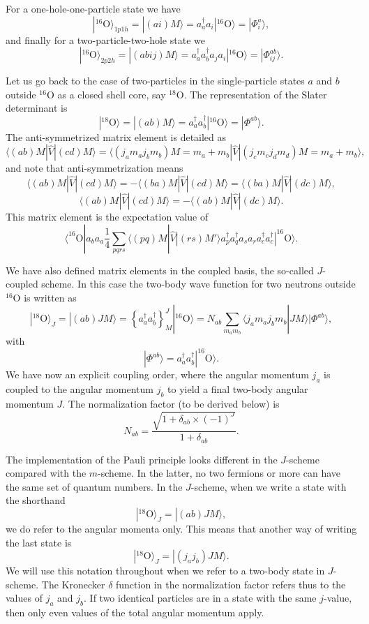 \documentclass[graybox,sectrefs,envcountresetchap,open=right]{svmonodo}
\begin{document}
For a one-hole-one-particle state we have
\[
|^{16}\mathrm{O}\rangle_{1p1h} =|(ai)M\rangle  = a_a^{\dagger}a_i|^{16}\mathrm{O}\rangle=|\Phi_{i}^a\rangle,
\]
and finally for a two-particle-two-hole state we 
\[
|^{16}\mathrm{O}\rangle_{2p2h} =|(abij)M\rangle  = a_a^{\dagger}a_b^{\dagger}a_ja_i|^{16}\mathrm{O}\rangle=|\Phi_{ij}^{ab}\rangle.
\]



Let us go back to the case of two-particles in the single-particle states $a$ and $b$ outside ${}^{16}\mbox{O}$ as a closed shell core, say ${}^{18}\mbox{O}$.
The representation of the Slater determinant is 
\[
|^{18}\mathrm{O}\rangle =|(ab)M\rangle  = a^{\dagger}_aa^{\dagger}_b|^{16}\mathrm{O}\rangle=|\Phi^{ab}\rangle.
\]
The anti-symmetrized matrix element is detailed as 
\[
\langle (ab) M | \hat{V} | (cd) M \rangle = \langle (j_am_aj_bm_b)M=m_a+m_b |  \hat{V} | (j_cm_cj_dm_d)M=m_a+m_b \rangle,
\]
and note that anti-symmetrization means 
\[
\langle (ab) M | \hat{V} | (cd) M \rangle =-\langle (ba) M | \hat{V} | (cd) M \rangle =\langle (ba) M | \hat{V} | (dc) M \rangle,
\]
\[
\langle (ab) M | \hat{V} | (cd) M \rangle =-\langle (ab) M | \hat{V} | (dc) M \rangle. 
\]
This matrix element is the expectation value of 
\[
\langle ^{16}\mathrm{O}|a_ba_a\frac{1}{4}\sum_{pqrs}\langle (pq) M | \hat{V} | (rs) M' \rangle a^{\dagger}_pa^{\dagger}_qa_sa_r a^{\dagger}_ca^{\dagger}_c|^{16}\mathrm{O}\rangle.
\]




We have also defined matrix elements in the coupled basis, the so-called $J$-coupled scheme.
In this case the two-body wave function for two neutrons outside ${}^{16}\mbox{O}$ is written as 
\[
|^{18}\mathrm{O}\rangle_J =|(ab)JM\rangle  = \left\{a^{\dagger}_aa^{\dagger}_b\right\}^J_M|^{16}\mathrm{O}\rangle=N_{ab}\sum_{m_am_b}\langle j_am_aj_bm_b|JM\rangle|\Phi^{ab}\rangle, 
\]
with
\[
|\Phi^{ab}\rangle=a^{\dagger}_aa^{\dagger}_b|^{16}\mathrm{O}\rangle.
\]
We have now an explicit coupling order, where the angular momentum $j_a$ is coupled to the angular momentum $j_b$ to yield a final two-body angular momentum $J$. 
The normalization factor (to be derived below) is
\[
N_{ab}=\frac{\sqrt{1+\delta_{ab}\times (-1)^J}}{1+\delta_{ab}}.
\]



The implementation of the Pauli principle looks different in the $J$-scheme compared with the $m$-scheme. In the latter, no two fermions or more can have the same set of quantum numbers. In the $J$-scheme, when we write a state with the shorthand 
\[
|^{18}\mathrm{O}\rangle_J =|(ab)JM\rangle,
\]
we do refer to the angular momenta only. This means that another way of writing the last state is
\[
|^{18}\mathrm{O}\rangle_J =|(j_aj_b)JM\rangle.
\]
We will use this notation throughout when we refer to a two-body state in $J$-scheme. The Kronecker $\delta$ function in the normalization factor 
refers thus to the values of $j_a$ and $j_b$. If two identical particles are in a state with the same $j$-value, then only even values of the total angular momentum apply.
\end{document}
